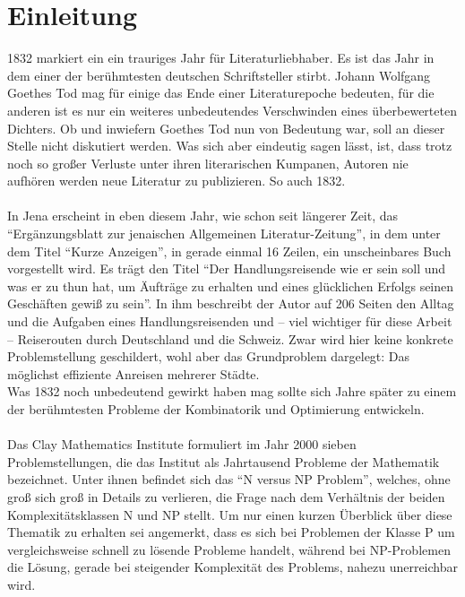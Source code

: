 \chapter{Einleitung}
1832 markiert ein ein trauriges Jahr für Literaturliebhaber.
Es ist das Jahr in dem einer der berühmtesten deutschen Schriftsteller stirbt.
Johann Wolfgang Goethes Tod\autocite[110]{Scholte.1951} mag für einige das Ende einer Literaturepoche bedeuten, für die anderen ist es nur ein weiteres unbedeutendes Verschwinden eines überbewerteten Dichters.
Ob und inwiefern Goethes Tod nun von Bedeutung war, soll an dieser Stelle nicht diskutiert werden.
Was sich aber eindeutig sagen lässt, ist, dass trotz noch so großer Verluste unter ihren literarischen Kumpanen, Autoren nie aufhören werden neue Literatur zu publizieren. 
So auch 1832.
\\\\
In Jena erscheint in eben diesem Jahr, wie schon seit längerer Zeit, das \enquote{Ergänzungsblatt zur jenaischen Allgemeinen Literatur-Zeitung}\autocite[232]{o.A..1832}, in dem unter dem Titel \enquote{Kurze Anzeigen}, in gerade einmal 16 Zeilen, ein unscheinbares Buch vorgestellt wird.
Es trägt den Titel \enquote{Der Handlungsreisende wie er sein soll und was er zu thun hat, um Äufträge zu erhalten und eines glücklichen Erfolgs seinen Geschäften gewiß zu sein}.
In ihm beschreibt der Autor auf 206 Seiten den Alltag und die Aufgaben eines Handlungsreisenden und -- viel wichtiger für diese Arbeit -- Reiserouten durch Deutschland und die Schweiz.
Zwar wird hier keine konkrete Problemstellung geschildert, wohl aber das Grundproblem dargelegt: Das möglichst effiziente Anreisen mehrerer Städte.
\\
Was 1832 noch unbedeutend gewirkt haben mag sollte sich Jahre später zu einem der berühmtesten Probleme der Kombinatorik und Optimierung entwickeln.
\\\\
Das Clay Mathematics Institute formuliert im Jahr 2000 sieben Problemstellungen, die das Institut als Jahrtausend Probleme der Mathematik bezeichnet.\autocite{o.A..o.J.}
Unter ihnen befindet sich das \enquote{N versus NP Problem}\autocite{Stephen.o.J.}, welches, ohne groß sich groß in Details zu verlieren, die Frage nach dem Verhältnis der beiden Komplexitätsklassen N und NP stellt.
Um nur einen kurzen Überblick über diese Thematik zu erhalten sei angemerkt, dass es sich bei Problemen der Klasse P um vergleichsweise schnell zu lösende Probleme handelt, während bei NP-Problemen die Lösung, gerade bei steigender Komplexität des Problems, nahezu unerreichbar wird.
